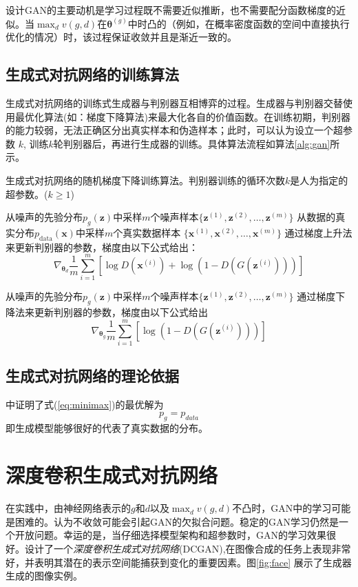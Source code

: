 \documentclass[11pt]{ctexart}
\begin{document}
	设计GAN的主要动机是学习过程既不需要近似推断，也不需要配分函数梯度的近似。当$\max_{d}v(g,d)$在$\bm\theta^{(g)}$中时凸的（例如，在概率密度函数的空间中直接执行优化的情况）时，该过程保证收敛并且是渐近一致的。
\subsection{生成式对抗网络的训练算法}
	生成式对抗网络的训练式生成器与判别器互相博弈的过程。生成器与判别器交替使用最优化算法(如：梯度下降算法)来最大化各自的价值函数。在训练初期，判别器的能力较弱，无法正确区分出真实样本和伪造样本；此时，可以认为设立一个超参数	$k$, 训练$k$轮判别器后，再进行生成器的训练。具体算法流程如算法\ref{alg:gan}所示。
	\begin{algorithm}
		\caption{生成式对抗网络的随机梯度下降训练算法。判别器训练的循环次数$k$是人为指定的超参数。($k\geq 1$) }
		\label{alg:gan}
		\begin{algorithmic}[1]
				\STATE 从噪声的先验分布$p_g(\bm z)$中采样$m$个噪声样本$\{\bm z^{(1)}, \bm z^{(2)}, \ldots,\bm  z^{(m)}\}$
				\STATE 从数据的真实分布$p_{\mathrm{data}}(\bm x)$中采样$m$个真实数据样本 $\{\bm x^{(1)}, \bm x^{(2)}, \ldots, \bm x^{(m)}\}$
				\STATE 通过梯度上升法来更新判别器的参数，梯度由以下公式给出：
						\[
						\nabla_{\bm \theta_d}\frac{1}{m} \sum_{i=1}^{m}\left[\log D\left(\bm x^{(i)}\right) + \log\left(1-D\left(G\left(\bm z^{(i)}\right)\right)\right)\right]
						\]
			\ENDFOR	
			
			\STATE 从噪声的先验分布$p_g(\bm z)$中采样$m$个噪声样本$\{\bm z^{(1)}, \bm z^{(2)}, \ldots,\bm  z^{(m)}\}$
			\STATE 通过梯度下降法来更新判别器的参数，梯度由以下公式给出
					\[
						\nabla_{\bm \theta_g}\frac{1}{m} \sum_{i=1}^{m}\left[ \log\left(1-D\left(G\left(\bm z^{(i)}\right)\right)\right)\right]
						\]
		\ENDFOR
		\end{algorithmic}
	\end{algorithm}

\subsection{生成式对抗网络的理论依据}
\cite{goodfellow2014generative}中证明了式(\ref{eq:minimax})的最优解为
	\[
		p_g = p_{data}
	\]
即生成模型能够很好的代表了真实数据的分布。
	
\section{深度卷积生成式对抗网络}
在实践中，由神经网络表示的$g$和$d$以及$\max_dv(g,d)$不凸时，GAN中的学习可能是困难的。\cite{goodfellow2014distinguishability}认为不收敛可能会引起GAN的欠拟合问题。稳定的GAN学习仍然是一个开放问题。幸运的是，当仔细选择模型架构和超参数时，GAN的学习效果很好。\cite{radford2015unsupervised}设计了一个\emph{深度卷积生成式对抗网络}(DCGAN),在图像合成的任务上表现非常好，并表明其潜在的表示空间能捕获到变化的重要因素。图\ref{fig:face} 展示了生成器生成的图像实例。
\end{document}

